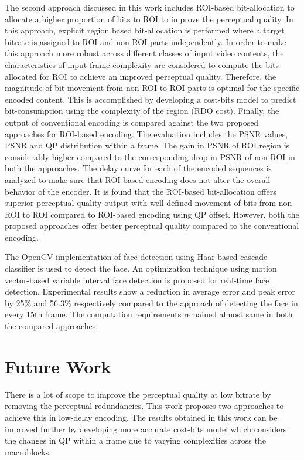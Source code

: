 The second approach discussed in this work includes ROI-based bit-allocation to allocate a higher proportion of bits to ROI to improve the perceptual quality. In this approach, explicit region based bit-allocation is performed where a target bitrate is assigned to ROI and non-ROI parts independently. In order to make this approach more robust across different classes of input video contents, the characteristics of input frame complexity are considered to compute the bits allocated for ROI to achieve an improved perceptual quality. Therefore, the magnitude of bit movement from non-ROI to ROI parts is optimal for the specific encoded content. This is accomplished by developing a cost-bits model to predict bit-consumption using the complexity of the region (RDO cost). Finally, the output of conventional encoding is compared against the two proposed approaches for ROI-based encoding. The evaluation includes the PSNR values, PSNR and QP distribution within a frame. The gain in PSNR of ROI region is considerably higher compared to the corresponding drop in PSNR of non-ROI in both the approaches. The delay curve for each of the encoded sequences is analyzed to make sure that ROI-based encoding does not alter the overall behavior of the encoder. It is found that the ROI-based bit-allocation offers superior perceptual quality output with well-defined movement of bits from non-ROI to ROI compared to ROI-based encoding using QP offset. However, both the proposed approaches offer better perceptual quality compared to the conventional encoding.

The OpenCV implementation of face detection using Haar-based cascade classifier is used to detect the face. An optimization technique using motion vector-based variable interval face detection is proposed for real-time face detection. Experimental results show a reduction in average error and peak error by 25\% and 56.3\% respectively compared to the approach of detecting the face in every 15th frame. The computation requirements remained almost same in both the compared approaches.

\section{Future Work}
There is a lot of scope to improve the perceptual quality at low bitrate by removing the perceptual redundancies. This work proposes two approaches to achieve this in low-delay encoding. The results obtained in this work can be improved further by developing more accurate cost-bits model which considers the changes in QP within a frame due to varying complexities across the macroblocks. 

